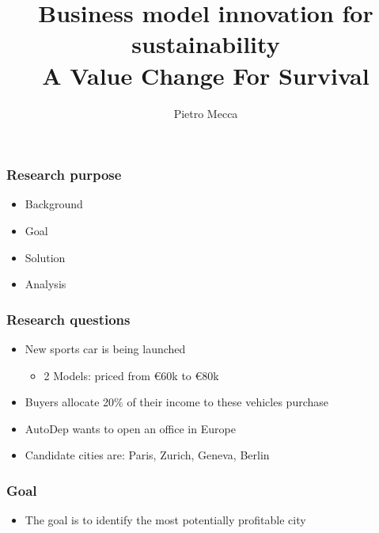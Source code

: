 \documentclass{beamer}
\title{Business model innovation for sustainability \\ A Value Change For Survival}
\author{Pietro Mecca}
\begin{document}
\maketitle

\begin{frame}
  \frametitle{Research purpose} %

  \begin{itemize}
    \item Background
    \item Goal
    \item Solution
    \item Analysis
  \end{itemize}
\end{frame}

\begin{frame}
  \frametitle{Research questions}  %

  \begin{itemize}
    \item New sports car is being launched
    \begin{itemize}
     \item 2 Models: priced from €60k to €80k
    \end{itemize}
    \item Buyers allocate 20\% of their income to these vehicles purchase
    \item AutoDep wants to open an office in Europe
    \item Candidate cities are: Paris, Zurich, Geneva, Berlin
  \end{itemize}
\end{frame}

\begin{frame}
  \frametitle{Goal} %

  \begin{itemize}
    \item The goal is to identify the most potentially profitable city
  \end{itemize}
\end{frame}
\end{document}
